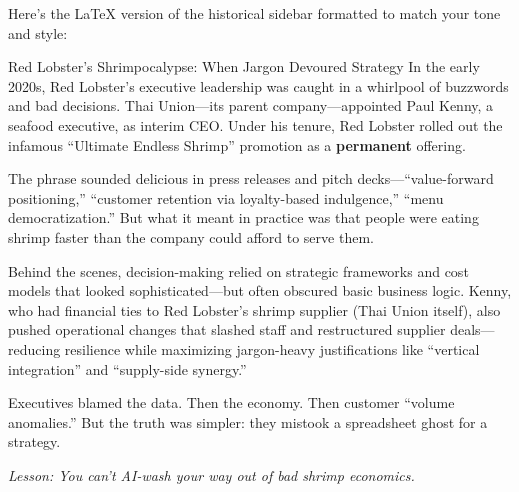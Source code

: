 Here's the LaTeX version of the historical sidebar formatted to match your tone and style:

\begin{HistoricalSidebar}{Red Lobster’s Shrimpocalypse: When Jargon Devoured Strategy}
In the early 2020s, Red Lobster’s executive leadership was caught in a whirlpool of buzzwords and bad decisions. Thai Union—its parent company—appointed Paul Kenny, a seafood executive, as interim CEO. Under his tenure, Red Lobster rolled out the infamous “Ultimate Endless Shrimp” promotion as a \textbf{permanent} offering.

The phrase sounded delicious in press releases and pitch decks—“value-forward positioning,” “customer retention via loyalty-based indulgence,” “menu democratization.” But what it meant in practice was that people were eating shrimp faster than the company could afford to serve them.

Behind the scenes, decision-making relied on strategic frameworks and cost models that looked sophisticated—but often obscured basic business logic. Kenny, who had financial ties to Red Lobster’s shrimp supplier (Thai Union itself), also pushed operational changes that slashed staff and restructured supplier deals—reducing resilience while maximizing jargon-heavy justifications like “vertical integration” and “supply-side synergy.”

Executives blamed the data. Then the economy. Then customer “volume anomalies.” But the truth was simpler: they mistook a spreadsheet ghost for a strategy.

\medskip

\textit{Lesson: You can’t AI-wash your way out of bad shrimp economics.}
\end{HistoricalSidebar}